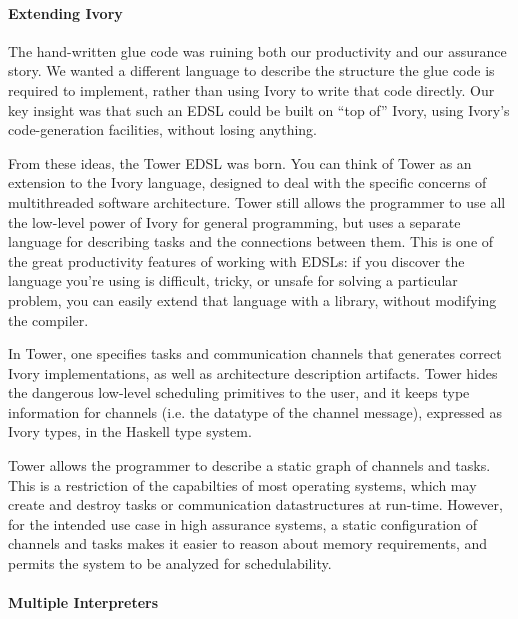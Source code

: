 \paragraph{Extending Ivory}
The hand-written glue code was ruining both our productivity and our assurance
story. We wanted a different language to describe the structure the glue code
is required to implement, rather than using Ivory to write that code directly.
Our key insight was that such an EDSL could be built on ``top of'' Ivory, using
Ivory's code-generation facilities, without losing anything.

From these ideas, the Tower EDSL was born. You can think of Tower as an
extension to the Ivory language, designed to deal with the specific concerns of
multithreaded software architecture. Tower still allows the programmer to use
all the low-level power of Ivory for general programming, but uses a separate
language for describing tasks and the connections between them.  This is one of
the great productivity features of working with EDSLs: if you discover the
language you're using is difficult, tricky, or unsafe for solving a particular
problem, you can easily extend that language with a library, without modifying
the compiler.

In Tower, one specifies tasks and communication channels that generates correct
Ivory implementations, as well as architecture description artifacts. Tower
hides the dangerous low-level scheduling primitives to the user, and it keeps
type information for channels (i.e. the datatype of the channel message),
expressed as Ivory types, in the Haskell type system.

Tower allows the programmer to describe a static graph of channels and tasks.
This is a restriction of the capabilties of most operating systems, which may
create and destroy tasks or communication datastructures at run-time. However,
for the intended use case in high assurance systems, a static configuration of
channels and tasks makes it easier to reason about memory requirements, and
permits the system to be analyzed for schedulability.

\paragraph{Multiple Interpreters}


